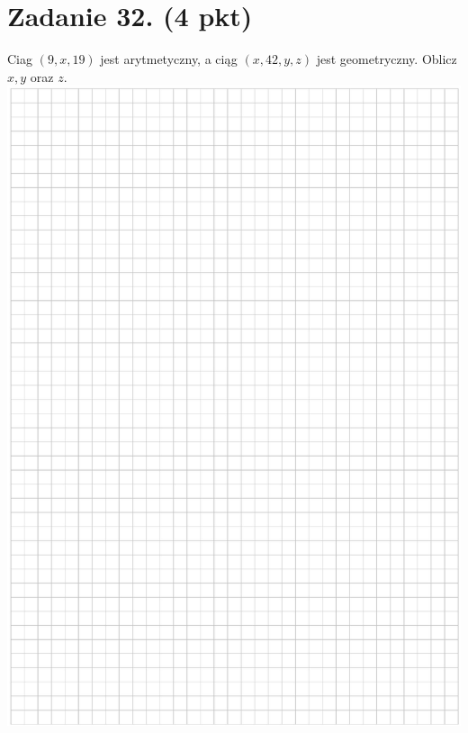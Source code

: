 \documentclass[10pt]{article}
\begin{document}
\section*{Zadanie 32. (4 pkt)}
Ciag \((9, x, 19)\) jest arytmetyczny, a ciąg \((x, 42, y, z)\) jest geometryczny. Oblicz \(x, y\) oraz \(z\).\\
\includegraphics[max width=\textwidth, center]{2024_11_21_dcf819de2d2eef051a0dg-14}
\end{document}
